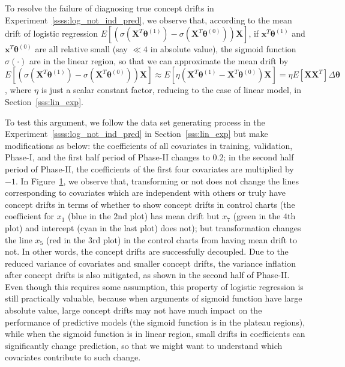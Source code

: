 \documentclass[twoside,11pt]{article}
\begin{document}
\begin{enumerate}[(I)]
\begin{figure}[!htbp]
{%
}
  \label{fig:log_reg_not_ind_X_1}
\end{figure}

To resolve the failure of diagnosing true concept drifts in Experiment~\ref{ssss:log_not_ind_pred}, we observe that, according to the mean drift of logistic regression $E [ (\sigma (\bm {X}^T\bm { \theta}^{ (1)}) - \sigma ( \bm {X}^T\bm { \theta}^{ (0)})) \bm {X}] $, if $ \bm {x}^T\bm { \theta}^{ (1)}$ and $ \bm {x}^T\bm { \theta}^{ (0)}$ are all relative small (say $\ll 4$ in absolute value), the sigmoid function $ \sigma (\cdot)$ are in the linear region, so that we can approximate the mean drift by $E [ (\sigma ( \bm {X}^T\bm { \theta}^{ (1)} ) - \sigma ( \bm {X}^T\bm { \theta}^{ (0)} )) \bm {X}] \approx E [ \eta( \bm {X}^T\bm { \theta}^{ (1)} -  \bm {X}^T\bm { \theta}^{ (0)} ) \bm {X}] = \eta E[\bm{XX}^T] \Delta \bm { \theta} $, where $ \eta$ is just a scalar constant factor, reducing to the case of linear model, in Section~\ref{sss:lin_exp}.  

To test this argument, we follow the data set generating process in the Experiment~\ref{ssss:log_not_ind_pred} in Section~\ref{sss:lin_exp} but make modifications as below: the coefficients of all covariates in training, validation, Phase-I, and the first half period of Phase-II changes to $0.2$; in the second half period of Phase-II, the coefficients of the first four covariates are multiplied by $-1$. In Figure~\ref{fig:log_reg_not_ind_X_1}, we observe that, transforming or not does not change the lines corresponding to covariates which are independent with others or truly have concept drifts in terms of whether to show concept drifts in control charts (the coefficient for $x_1$ (blue in the $2$nd plot) has mean drift but $x_7$ (green in the $4$th plot) and intercept (cyan in the last plot) does not); but transformation changes the line $x_5$ (red in the $3$rd plot) in the control charts from having mean drift to not. In other words, the concept drifts are successfully decoupled. Due to the reduced variance of covariates and smaller concept drifts, the variance inflation after concept drifts is also mitigated, as shown in the second half of Phase-II. Even though this requires some assumption, this property of logistic regression is still practically valuable, because when arguments of sigmoid function have large absolute value, large concept drifts may not have much impact on the performance of predictive models (the sigmoid function is in the plateau regions), while when the sigmoid function is in linear region, small drifts in coefficients can significantly change prediction, so that we might want to understand which covariates contribute to such change.


\end{enumerate}
\end{document}
